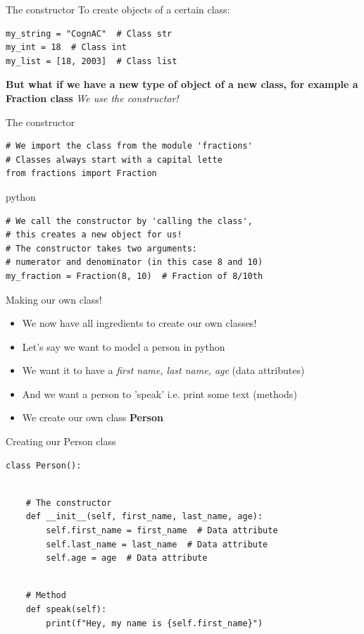 \begin{frame}[fragile]{The constructor}
To create objects of a certain class:
\pause
\begin{verbatim}
my_string = "CognAC"  # Class str
my_int = 18  # Class int
my_list = [18, 2003]  # Class list
\end{verbatim}
\pause
\textbf{But what if we have a new type of object of a new class, for example a Fraction class}
\pause
\textit{We use the constructor!}
\end{frame}

\begin{frame}[fragile]{The constructor}
\begin{verbatim}
# We import the class from the module 'fractions'
# Classes always start with a capital lette
from fractions import Fraction
\end{verbatim}{python}
\pause
\begin{verbatim}
# We call the constructor by 'calling the class',
# this creates a new object for us!
# The constructor takes two arguments:
# numerator and denominator (in this case 8 and 10)
my_fraction = Fraction(8, 10)  # Fraction of 8/10th
\end{verbatim}
\end{frame}

\begin{frame}{Making our own class!}
\begin{itemize}
    \pause
    \item We now have all ingredients to create our own classes!
    \pause
    \item Let's say we want to model a person in python
    \pause
    \item We want it to have a \textit{first name, last name, age} (data attributes)
    \pause
    \item And we want a person to 'speak' i.e. print some text (methods)
    \pause
    \item We create our own class \textbf{Person}
\end{itemize}
\end{frame}

\begin{frame}[fragile]{Creating our Person class}
\begin{verbatim}
class Person():
\end{verbatim}
\pause
\begin{verbatim}
    
    # The constructor
    def __init__(self, first_name, last_name, age):
        self.first_name = first_name  # Data attribute
        self.last_name = last_name  # Data attribute
        self.age = age  # Data attribute
\end{verbatim}
\pause
\begin{verbatim}

    # Method
    def speak(self):
        print(f"Hey, my name is {self.first_name}")
\end{verbatim}
\end{frame}


